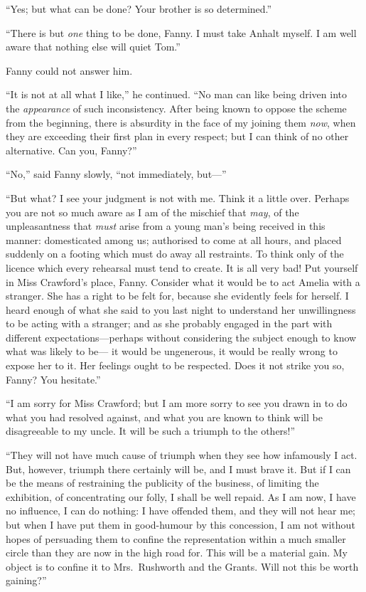 \documentclass{article}
\begin{document}
``Yes; but what can be done?  Your brother is so determined.''

``There is but \emph{one} thing to be done, Fanny.  I must
take Anhalt myself.  I am well aware that nothing else
will quiet Tom.''

Fanny could not answer him.

``It is not at all what I like,'' he continued.  ``No man can
like being driven into the \emph{appearance} of such inconsistency.
After being known to oppose the scheme from the beginning,
there is absurdity in the face of my joining them \emph{now},
when they are exceeding their first plan in every respect;
but I can think of no other alternative.  Can you, Fanny?''

``No,'' said Fanny slowly, ``not immediately, but---''

``But what?  I see your judgment is not with me.  Think it
a little over.  Perhaps you are not so much aware as I am
of the mischief that \emph{may}, of the unpleasantness that \emph{must}
arise from a young man's being received in this manner:
domesticated among us; authorised to come at all hours,
and placed suddenly on a footing which must do away
all restraints.  To think only of the licence which every
rehearsal must tend to create.  It is all very bad!
Put yourself in Miss Crawford's place, Fanny.
Consider what it would be to act Amelia with a stranger.
She has a right to be felt for, because she evidently
feels for herself.  I heard enough of what she said to you
last night to understand her unwillingness to be acting
with a stranger; and as she probably engaged in the part
with different expectations---perhaps without considering
the subject enough to know what was likely to be---%
it would be ungenerous, it would be really wrong to
expose her to it.  Her feelings ought to be respected.
Does it not strike you so, Fanny?  You hesitate.''

``I am sorry for Miss Crawford; but I am more sorry to see
you drawn in to do what you had resolved against, and what
you are known to think will be disagreeable to my uncle.
It will be such a triumph to the others!''

``They will not have much cause of triumph when they
see how infamously I act.  But, however, triumph there
certainly will be, and I must brave it.  But if I can be
the means of restraining the publicity of the business,
of limiting the exhibition, of concentrating our folly,
I shall be well repaid.  As I am now, I have no influence,
I can do nothing:  I have offended them, and they will
not hear me; but when I have put them in good-humour
by this concession, I am not without hopes of persuading
them to confine the representation within a much
smaller circle than they are now in the high road for.
This will be a material gain.  My object is to confine
it to Mrs.\ Rushworth and the Grants.  Will not this be
worth gaining?''
\end{document}
